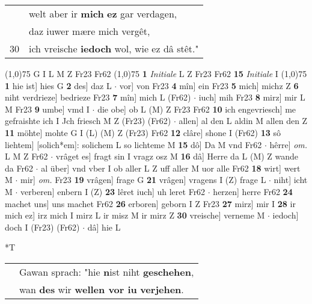 \documentclass[8pt,a4paper,notitlepage]{article}
\begin{document}
\begin{table}[ht]
\begin{minipage}[t]{0.5\linewidth}
\begin{tabular}{rl}
 & welt aber ir \textbf{mich} \textbf{ez} gar verdagen,\\ 
 & daz iuwer mære mich vergêt,\\ 
30 & ich vreische \textbf{iedoch} wol, wie ez dâ stêt."\\ 
\end{tabular}
\scriptsize
\line(1,0){75} \newline
G I L M Z Fr23 Fr62 \newline
\line(1,0){75} \newline
\textbf{1} \textit{Initiale} L Z Fr23 Fr62  \textbf{15} \textit{Initiale} I  \newline
\line(1,0){75} \newline
\textbf{1} hie ist] hies G \textbf{2} des] daz L  $\cdot$ vor] von Fr23 \textbf{4} mîn] ein Fr23 \textbf{5} mich] michz Z \textbf{6} niht verdrieze] bedrieze Fr23 \textbf{7} mîn] mich L (Fr62)  $\cdot$ iuch] mih Fr23 \textbf{8} mirz] mir L M Fr23 \textbf{9} umbe] vmd I  $\cdot$ die obe] ob L (M) Z Fr23 Fr62 \textbf{10} ich engevriesch] me gefraishte ich I Jch friesch M Z (Fr23) (Fr62)  $\cdot$ allen] al den L aldin M allen den Z \textbf{11} möhte] mohte G I (L) (M) Z (Fr23) Fr62 \textbf{12} clâre] shone I (Fr62) \textbf{13} sô liehtem] [solich*em]: solichem L so lichteme M \textbf{15} dô] Da M vnd Fr62  $\cdot$ hêrre] \textit{om.} L M Z Fr62  $\cdot$ vrâget es] fragt sin I vragz osz M \textbf{16} dâ] Herre da L (M) Z wande da Fr62  $\cdot$ al über] vnd vber I ob aller L Z uff aller M uor alle Fr62 \textbf{18} wirt] wert M  $\cdot$ mir] \textit{om.} Fr23 \textbf{19} vrâgen] frage G \textbf{21} vrâgen] vragens I (Z) frage L  $\cdot$ niht] icht M  $\cdot$ verberen] enbern I (Z) \textbf{23} lêret iuch] uh leret Fr62  $\cdot$ herzen] herre Fr62 \textbf{24} machet uns] uns machet Fr62 \textbf{26} erboren] geborn I Z Fr23 \textbf{27} mirz] mir I \textbf{28} ir mich ez] irz mich I mirz L ir misz M ir mirz Z \textbf{30} vreische] verneme M  $\cdot$ iedoch] doch I (Fr23) (Fr62)  $\cdot$ dâ] hie L \newline
\end{minipage}
\hspace{0.5cm}
\begin{minipage}[t]{0.5\linewidth}
\small
\begin{center}*T
\end{center}
\begin{tabular}{rl}
 & Gawan sprach: "hie \textbf{n}ist niht \textbf{geschehen},\\ 
 & wan \textbf{des} wir \textbf{wellen vor iu} \textbf{verjehen}.\\ 

\end{tabular}
\end{minipage}
\end{table}
\end{document}
